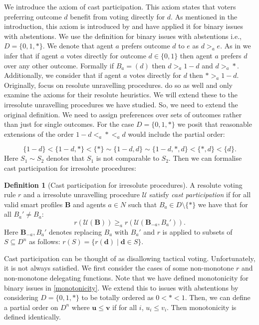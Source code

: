 \documentclass[11pt,a4paper, titlepage]{article}
\theoremstyle{definition}
\newtheorem{definition}[theorem]{Definition}
\let\vec\mathbf
\begin{document}
We introduce the axiom of cast participation. This axiom states that voters preferring outcome $d$ benefit from voting directly for $d$. 
As mentioned in the introduction, this axiom is introduced by \cite{kotsialou} and \cite{grandi} have applied it for binary issues with abstentions. 
We use the definition for binary issues with abstentions i.e., $D = \{0, 1, *\}$.
We denote that agent $a$ prefers outcome $d$ to $e$ as $d >_a e$. As in \citeauthor{grandi} we infer that if agent $a$ votes directly for outcome $d \in \{0, 1\}$ then agent $a$ prefers $d$ over any other outcome. 
Formally if $B_a = (d)$ then $ d >_a 1-d$ and $d >_a *$.
Additionally, we consider that if agent $a$ votes directly for $d$ then $* >_a 1-d$. 
Originally, \citeauthor{kotsialou} focus on resolute unravelling procedures. \citeauthor{grandi} do so as well and only examine the axioms for their resolute heuristics.
We will extend these to the irresolute unravelling procedures we have studied.
So, we need to extend the original definition. 
We need to assign preferences over sets of outcomes rather than just for single outcomes.
For the case $D = \{0, 1, *\}$ we posit that reasonable extensions of the order $1-d <_a * <_a d$ would include the partial order:

\[
    \{1-d\} < \{1-d, *\} < \{*\} \sim \{1-d, d\} \sim \{1-d, *, d\} < \{*, d \}< \{d\}.
\]
Here $S_1 \sim S_2$ denotes that $S_1$ is not comparable to $S_2$.
Then we can formalise cast participation for irresolute procedures:

\begin{definition}[Cast participation for irresolute procedures]
    A resolute voting rule $r$ and a irresolute unravelling procedure $\mathcal{U}$ satisfy \emph{cast participation} if for all valid smart profiles $\mathbf{B}$ and agents $a \in N$ such that $B_a \in D \setminus \{*\}$ we have that for all $B_a' \neq B_a$:
    \[
        r(\mathcal{U}(\mathbf{B})) \geq_a r(\mathcal{U}(\mathbf{B}_{-a}, B_a')).
    \]
    Here $\mathbf{B}_{-a}, B_a'$ denotes replacing $B_a$ with $B_a'$ and $r$ is applied to subsets of $S \subseteq D^n$ as follows: $r(S) = \{r(\vec{d}) \mid \vec{d} \in S\}$.
\end{definition}

Cast participation can be thought of as disallowing tactical voting. Unfortunately, it is not always satisfied. 
We first consider the cases of some non-monotone $r$ and non-monotone delegating functions. 
Note that we have defined monotonicity for binary issues in \cref{monotonicity}. 
We extend this to issues with abstentions by considering $D = \{0, 1, *\}$ to be totally ordered as $0 < * < 1$.
Then, we can define a partial order on $D^n$ where $\vec{u} \leq \vec{v}$ if for all $i$, $u_i \leq v_i$. Then monotonicity is defined identically.
\end{document}
